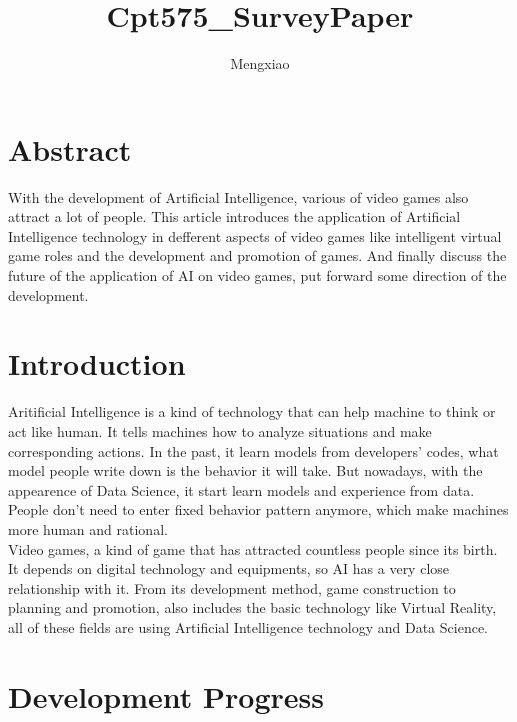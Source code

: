 \documentclass[12pt]{article}
\author{Mengxiao}
\title{Cpt575\_SurveyPaper}
\begin{document}
	\maketitle
	\pagebreak
    \section{Abstract}
        With the development of Artificial Intelligence, various of video games also
        attract a lot of people. This article introduces the application of Artificial
        Intelligence technology in defferent aspects of video games like intelligent virtual
        game roles and the development and promotion of games. And finally discuss the future
        of the application of AI on video games, put forward some direction of the development.
	\section{Introduction}
        Aritificial Intelligence is a kind of technology that can help machine to think or
        act like human. It tells machines how to analyze situations and make corresponding
        actions. In the past, it learn models from developers' codes, what model people write
        down is the behavior it will take. But nowadays, with the appearence of Data Science, it
        start learn models and experience from data. People don't need to enter fixed behavior
        pattern anymore, which make machines more human and rational.\\
        Video games, a kind of game that has attracted countless people since its birth. It depends
        on digital technology and equipments, so AI has a very close relationship with it. From
        its development method, game construction to planning and promotion, also includes the
        basic technology like Virtual Reality, all of these fields are using Artificial Intelligence
        technology and Data Science.
    \section{Development Progress}
\end{document}

